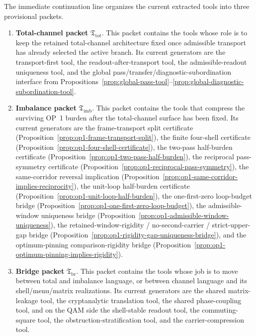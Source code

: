 \begin{definition}
\label{def:normalized-channel-sorted-tool-packets}
The immediate continuation line organizes the current extracted tools into three provisional packets.
\begin{enumerate}[leftmargin=2em]
 \item \textbf{Total-channel packet} \(\mathfrak T_{\mathrm{tot}}\). This packet contains the tools whose role is to keep the retained total-channel architecture fixed once admissible transport has already selected the active branch. Its current generators are the transport-first tool, the readout-after-transport tool, the admissible-readout uniqueness tool, and the global pass/transfer/diagnostic-subordination interface from Propositions~\ref{prop:global-pass-tool}--\ref{prop:global-diagnostic-subordination-tool}.

 \item \textbf{Imbalance packet} \(\mathfrak T_{\mathrm{imb}}\). This packet contains the tools that compress the surviving OP~1 burden after the total-channel surface has been fixed. Its current generators are the frame-transport split certificate (Proposition~\ref{prop:op1-frame-transport-split}), the finite four-shell certificate (Proposition~\ref{prop:op1-four-shell-certificate}), the two-pass half-burden certificate (Proposition~\ref{prop:op1-two-pass-half-burden}), the reciprocal pass-symmetry certificate (Proposition~\ref{prop:op1-reciprocal-pass-symmetry}), the same-corridor reversal implication (Proposition~\ref{prop:op1-same-corridor-implies-reciprocity}), the unit-loop half-burden certificate (Proposition~\ref{prop:op1-unit-loop-half-burden}), the one-first-zero loop-budget bridge (Proposition~\ref{prop:op1-one-first-zero-loop-budget}), the admissible-window uniqueness bridge (Proposition~\ref{prop:op1-admissible-window-uniqueness}), the retained-window-rigidity / no-second-carrier / strict-upper-gap bridge (Proposition~\ref{prop:op1-rigidity-gap-uniqueness-bridge}), and the optimum-pinning comparison-rigidity bridge (Proposition~\ref{prop:op1-optimum-pinning-implies-rigidity}).

 \item \textbf{Bridge packet} \(\mathfrak T_{\mathrm{br}}\). This packet contains the tools whose job is to move between total and imbalance language, or between channel language and its shell/menu/matrix realizations. Its current generators are the shared matrix-leakage tool, the cryptanalytic translation tool, the shared phase-coupling tool, and on the QAM side the shell-stable readout tool, the commuting-square tool, the obstruction-stratification tool, and the carrier-compression tool.
\end{enumerate}
\end{definition}

